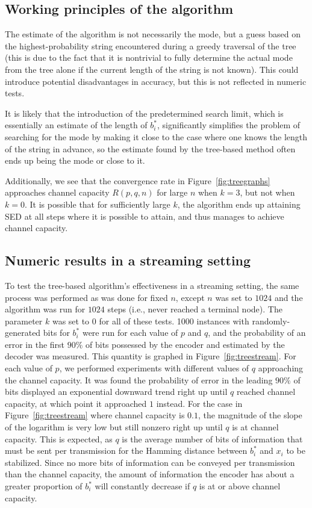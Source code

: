 \documentclass{IEEEtran}
\begin{document}
\subsection{Working principles of the algorithm}
The estimate of the algorithm is not necessarily
the mode, but a guess based on the highest-probability
string encountered during a greedy traversal of the tree (this is
due to the fact that it is nontrivial to fully determine the actual mode
from the tree alone
if the current length of the string is not known).
This could
introduce potential disadvantages in accuracy, but this is not reflected
in numeric tests. 

It is likely that the introduction of the predetermined
search limit, which is essentially an estimate of the length of $b_i^*$,
significantly simplifies the problem of searching for the mode by making
it close to the case where one knows the length of the string in advance,
so the estimate found by the tree-based method often ends up being the
mode or close to it.

Additionally, we see that the convergence rate in Figure~\ref{fig:treegraphs}
approaches channel capacity $R(p,q,n)$ for large $n$ 
when $k=3$, but not when $k=0$. It is possible that
for sufficiently large $k$, the algorithm ends up attaining SED at all steps
where it is possible to attain, and thus manages to achieve channel capacity.

\subsection{Numeric results in a streaming setting}
To test the tree-based algorithm's effectiveness in a streaming setting,
the same process was performed as was done for fixed $n$, except $n$ was
set to $1024$ and the algorithm was run for $1024$ steps (i.e., never
reached a terminal node). The parameter $k$ was set to $0$ for all of these
tests. 1000 instances with randomly-generated bits
for $b_i^*$ were
run for each
value of $p$ and $q$, and the
probability of an error in the first $90\%$ of bits
possessed by the encoder and estimated by the decoder was measured. This
quantity is graphed in Figure~\ref{fig:treestream}. For each value
of $p$, we performed experiments with
different values of $q$ approaching the channel capacity.
It was found the probability of error in the leading $90\%$ of bits
displayed an exponential downward trend
right up until $q$ reached channel capacity, at which point it approached
$1$ instead. For the case in Figure~\ref{fig:treestream} where channel capacity
is $0.1$, the magnitude of the slope of the logarithm is very low but still
nonzero right up until $q$ is at channel capacity.
This is expected, as $q$ is the average number of
bits of information that must be sent per transmission for the
Hamming distance between
$b_i^*$ and $x_i$ to be stabilized. Since no more bits of information can
be conveyed per transmission than the channel capacity, the amount of
information the encoder has about a greater proportion of $b_i^*$ will
constantly decrease if $q$ is at or above channel capacity.
\end{document}
